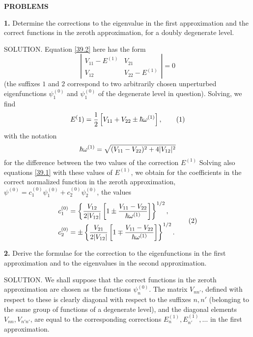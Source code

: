 {\small



\textbf{PROBLEMS}


\textbf{1.} Determine the corrections to the eigenvalue in the first approximation and the correct functions in the zeroth approximation, for a doubly degenerate level.





SOLUTION. Equation \eqref{39.2} here has the form
\[ \left|\begin{array}{cc}
V_{11}-E^{(1)}&V_{21}\\
V_{12}&V_{22}-E^{(1)}
\end{array}  \right|=0 \]
(the suffixes $ 1 $ and $ 2 $ correspond to two arbitrarily chosen unperturbed eigenfunctions $ \psi_1^{(0)} $ and $ \psi_1^{(0)} $ of the degenerate level in question). Solving, we find
\begin{equation}\label{39-1-1}
E^(1)=\frac{1}{2}\left[V_{11}+V_{22}\pm\hbar\omega^{(1)} \right],\tag{1}
\end{equation}
with the notation
\[ \hbar\omega^{(1)}=\sqrt{(V_{11}-V_{22})^2+4|V_{12}|^2} \]
for the difference between the two values of the correction $ E^{(1)} $ Solving also equations \eqref{39.1} with these values of $ E^{(1)} $, we obtain for the coefficients in the correct normalized function in the zeroth approximation, $ \psi^{(0)} = c_1^{(0)} \psi_1^{(0)} + c_2^{(0)} \psi_2^{(0)} $, the values
\begin{equation}\label{39-1-2}
\begin{split}
c_1^{(0)}&=\left\{\frac{V_{12}}{2|V_{12}|}\left[1\pm \frac{V_{11}-V_{22}}{\hbar\omega^{(1)}}\right]  \right\}^{1/2},\\
c_2^{(0)}&=\pm\left\{\frac{V_{21}}{2|V_{12}|}\left[1\mp\frac{V_{11}-V_{22}}{\hbar\omega^{(1)}} \right] \right\}^{1/2}.
\end{split}\tag{2}
\end{equation}






\textbf{2.} Derive the formulae for the correction to the eigenfunctions in the first approximation and to the eigenvalues in the second approximation.





SOLUTION. We shall suppose that the correct functions in the zeroth approximation are chosen as the functions $ \psi_n^{(0)} $. The matrix $ V_{nn'} $, defined with respect to these is clearly diagonal with respect to the suffixes $ n, n' $ (belonging to the same group of functions of a degenerate level), and the diagonal elements $ V_{nn}, V_{n'n'} $, are equal to the corresponding corrections $ E_n^{(1)}, E_{n'}^{(1)}, \dots $ in the first approximation.

}
